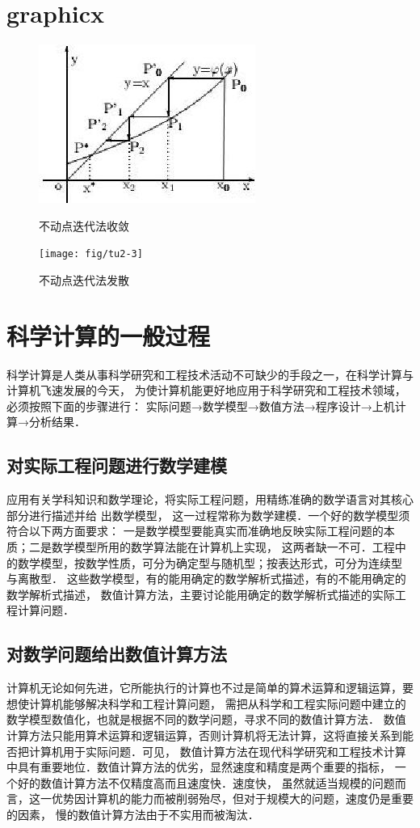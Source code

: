 \section{graphicx}

\begin{figure}[h]
\begin{minipage}[t]{0.5\linewidth}
\centering
\includegraphics[totalheight=1.2in]{fig/tu2-2}
\caption{不动点迭代法收敛} \label{fig:tu2-2}
\end{minipage}
\begin{minipage}[t]{0.5\linewidth}
\centering
\texttt{[image: fig/tu2-3]}
\caption{不动点迭代法发散} \label{fig:tu2-3}
\end{minipage}
\end{figure}

\section{科学计算的一般过程}
科学计算是人类从事科学研究和工程技术活动不可缺少的手段之一，在科学计算与计算机飞速发展的今天，
为使计算机能更好地应用于科学研究和工程技术领域，必须按照下面的步骤进行：
实际问题→数学模型→数值方法→程序设计→上机计算→分析结果．
\subsection{对实际工程问题进行数学建模}
应用有关学科知识和数学理论，将实际工程问题，用精练准确的数学语言对其核心部分进行描述并给
出数学模型，
这一过程常称为数学建模．一个好的数学模型须符合以下两方面要求：
一是数学模型要能真实而准确地反映实际工程问题的本质；二是数学模型所用的数学算法能在计算机上实现，
这两者缺一不可．工程中的数学模型，按数学性质，可分为确定型与随机型；按表达形式，可分为连续型
与离散型．
这些数学模型，有的能用确定的数学解析式描述，有的不能用确定的数学解析式描述，
数值计算方法，主要讨论能用确定的数学解析式描述的实际工程计算问题．
\subsection{对数学问题给出数值计算方法}
计算机无论如何先进，它所能执行的计算也不过是简单的算术运算和逻辑运算，要想使计算机能够解决科学和工程计算问题，
需把从科学和工程实际问题中建立的数学模型数值化，也就是根据不同的数学问题，寻求不同的数值计算方法．
数值计算方法只能用算术运算和逻辑运算，否则计算机将无法计算，这将直接关系到能否把计算机用于实际问题．可见，
数值计算方法在现代科学研究和工程技术计算中具有重要地位．数值计算方法的优劣，显然速度和精度是两个重要的指标，
一个好的数值计算方法不仅精度高而且速度快．速度快，
虽然就适当规模的问题而言，这一优势因计算机的能力而被削弱殆尽，但对于规模大的问题，速度仍是重要的因素，
慢的数值计算方法由于不实用而被淘汰．
